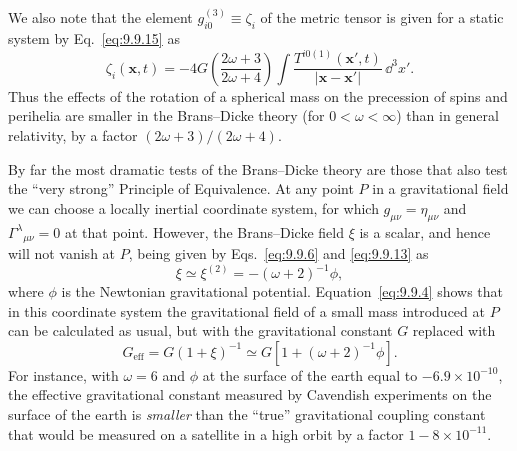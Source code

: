 We also note that the element \(g_{i0}^{(3)}\equiv\zeta_i\) of the metric
tensor is given for a static system by Eq.~\eqref{eq:9.9.15} as
\begin{equation}
  \zeta_i(\mathbf x,t)
  =
  -4G\left(\frac{2\omega+3}{2\omega+4}\right)
  \int
  \frac{T^{i0(1)}(\mathbf x',t)}
       {|\mathbf x-\mathbf x'|}\,\dd^3x'.
  \tag{9.9.28}\label{eq:9.9.28}
\end{equation}
Thus the effects of the rotation of a spherical mass on the precession of
spins and perihelia are smaller in the Brans--Dicke theory (for
\(0<\omega<\infty\)) than in general relativity, by a factor
\((2\omega+3)/(2\omega+4)\).

By far the most dramatic tests of the Brans--Dicke theory are those that
also test the ``very strong'' Principle of Equivalence. At any point \(P\)
in a gravitational field we can choose a locally inertial coordinate
system, for which \(g_{\mu\nu}=\eta_{\mu\nu}\) and
\(\Gamma^\lambda{}_{\mu\nu}=0\) at that point. However, the Brans--Dicke
field \(\xi\) is a scalar, and hence will not vanish at \(P\), being given
by Eqs.~\eqref{eq:9.9.6} and \eqref{eq:9.9.13} as
\[
  \xi\simeq\xi^{(2)}=-(\omega+2)^{-1}\phi,
\]
where \(\phi\) is the Newtonian gravitational potential.
Equation~\eqref{eq:9.9.4} shows that in this coordinate system the
gravitational field of a small mass introduced at \(P\) can be calculated
as usual, but with the gravitational constant \(G\) replaced with
\begin{equation}
  G_{\mathrm{eff}}
  =
  G(1+\xi)^{-1}
  \simeq
  G\left[1+(\omega+2)^{-1}\phi\right].
  \tag{9.9.29}\label{eq:9.9.29}
\end{equation}
For instance, with \(\omega=6\) and \(\phi\) at the surface of the earth
equal to \(-6.9\times10^{-10}\), the effective gravitational constant
measured by Cavendish experiments on the surface of the earth is
\emph{smaller} than the ``true'' gravitational coupling constant that
would be measured on a satellite in a high orbit by a factor
\(1-8\times10^{-11}\).
